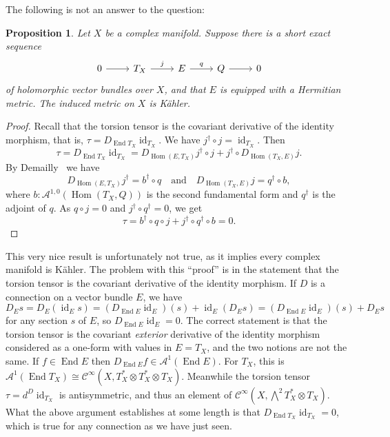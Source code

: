 \documentclass[11pt]{article}
\newtheorem{prop}[theo]{Proposition}
\newtheorem*{proof}{Proof}
\newcommand{\cc}[1]{\mathcal{#1}}
\def\qandq{\quad\text{and}\quad}
\DeclareMathOperator{\End}{End}
\DeclareMathOperator{\Hom}{Hom}
\DeclareMathOperator{\id}{id}
\begin{document}
The following is not an answer to the question:



\begin{prop}
Let $X$ be a complex manifold. Suppose there is a short exact sequence
\[
\begin{tikzcd}
0 \arrow[r] & T_X \arrow[r,"j"] & E \arrow[r,"q"] & Q \arrow[r] & 0
\end{tikzcd}
\]
of holomorphic vector bundles over $X$, and that $E$ is equipped with a Hermitian metric. The induced metric on $X$ is K\"ahler.
\end{prop}

\begin{proof}
Recall that the torsion tensor is the covariant derivative of the identity morphism, that is, $\tau = D_{\End T_X} \id_{T_X}$.
We have $j^\dagger \circ j = \id_{T_X}$. Then
\[
\tau
= D_{\End T_X} \id_{T_X}
= D_{\Hom(E,T_X)}j^\dagger \circ j + j^\dagger \circ D_{\Hom(T_X,E)}j.
\]
By Demailly~\cite[Theorem~14.3]{demailly-complex} we have
\[
D_{\Hom(E,T_X)}j^\dagger
= b^\dagger \circ q
\qandq
D_{\Hom(T_X,E)}j
= q^\dagger \circ b,
\]
where $b : \cc A^{1,0}(\Hom(T_X,Q))$ is the second fundamental form and $q^\dagger$ is the adjoint of $q$.
As $q \circ j = 0$ and $j^\dagger \circ q^\dagger = 0$, we get
\[
\tau
= b^\dagger \circ q \circ j
+ j^\dagger \circ q^\dagger \circ b
= 0.
\]
\end{proof}

This very nice result is unfortunately not true, as it implies every complex manifold is K\"ahler. The problem with this ``proof'' is in the statement that the torsion tensor is the covariant derivative of the identity morphism. If $D$ is a connection on a vector bundle $E$, we have
\[
D_E s
= D_E(\id_{E} s)
= (D_{\End E}\id_E)(s) + \id_E(D_Es)
= (D_{\End E}\id_E)(s) + D_Es
\]
for any section $s$ of $E$, so $D_{\End E}\id_E = 0$. The correct statement is that the torsion tensor is the covariant \emph{exterior} derivative of the identity morphism considered as a one-form with values in $E = T_X$, and the two notions are not the same. If $f \in \End E$ then $D_{\End E}f \in \cc A^1(\End E)$. For $T_X$, this is $\cc A^1(\End T_X) \cong \cc C^\infty(X,T_X^* \otimes T_X^* \otimes T_X)$. Meanwhile the torsion tensor $\tau = d^D \id_{T_X}$ is antisymmetric, and thus an element of $\cc C^\infty(X,\bigwedge^2 T_X^* \otimes T_X)$. What the above argument establishes at some length is that $D_{\End T_X} \id_{T_X} = 0$, which is true for any connection as we have just seen.
\end{document}
